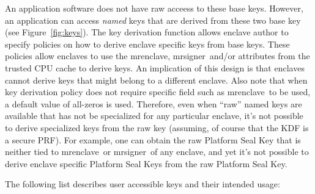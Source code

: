 \documentclass[10pt]{article}
\newcommand{\mrenclave}{\textsf{mrenclave}}
\newcommand{\mrsigner}{\textsf{mrsigner}}
\begin{document}
  An application software does not have raw acceess to these base
  keys. However, an application can access \textit{named} keys that
  are derived from these two base key (see Figure~\ref{fig:keys}).
  The key derivation function allows enclave author to specify
  policies on how to derive enclave specific keys from base
  keys. These policies allow enclaves to use the \mrenclave,
  \mrsigner\ and/or attributes from the trusted CPU cache to derive
  keys. An implication of this design is that enclaves cannot derive
  keys that might belong to a different enclave. Also note that when
  key derivation policy does not require specific field such as
  \mrenclave\ to be used, a default value of all-zeros is
  used. Therefore, even when ``raw'' named keys are available that has
  not be specialized for any particular enclave, it's not possible to
  derive specialized keys from the raw key (assuming, of course that
  the KDF is a secure PRF). For example, one can obtain the raw
  Platform Seal Key that is neither tied to \mrenclave\ or
  \mrsigner\ of any enclave, and yet it's not possible to derive
  enclave specific Platform Seal Keys from the raw Platform Seal Key.

  The following list describes user accessible keys and their intended
  usage:
\end{document}
